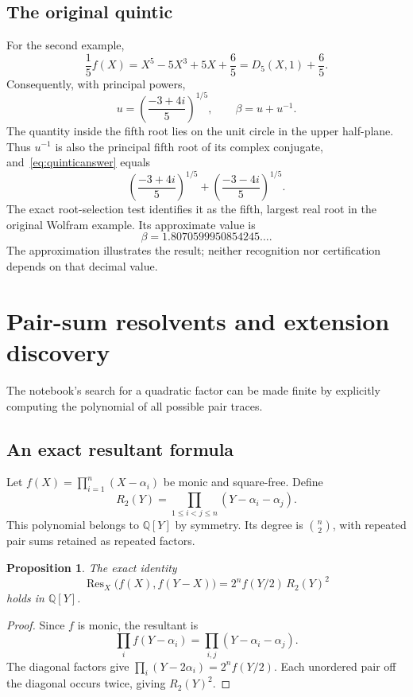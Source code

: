 \documentclass[11pt,a4paper]{article}
\newcommand{\Q}{\mathbb Q}
\newcommand{\Res}{\operatorname{Res}}
\newtheorem{proposition}[theorem]{Proposition}
\theoremstyle{definition}
\theoremstyle{remark}
\begin{document}
\subsection{The original quintic}

For the second example,
\[
 \frac15 f(X)=X^5-5X^3+5X+\frac65=D_5(X,1)+\frac65.
\]
Consequently, with principal powers,
\begin{equation}
 u=\left(\frac{-3+4i}{5}\right)^{1/5},\qquad
 \boxed{\displaystyle \beta=u+u^{-1}}.
 \label{eq:quinticanswer}
\end{equation}
The quantity inside the fifth root lies on the unit circle in the upper half-plane. Thus $u^{-1}$ is also the principal fifth root of its complex conjugate, and~\eqref{eq:quinticanswer} equals
\[
 \left(\frac{-3+4i}{5}\right)^{1/5}
 +\left(\frac{-3-4i}{5}\right)^{1/5}.
\]
The exact root-selection test identifies it as the fifth, largest real root in the original Wolfram example. Its approximate value is
\[
 \beta=1.8070599950854245\ldots.
\]
The approximation illustrates the result; neither recognition nor certification depends on that decimal value.

\section{Pair-sum resolvents and extension discovery}\label{sec:pairs}

The notebook's search for a quadratic factor can be made finite by explicitly computing the polynomial of all possible pair traces.

\subsection{An exact resultant formula}

Let $f(X)=\prod_{i=1}^{n}(X-\alpha_i)$ be monic and square-free. Define
\begin{equation}
 R_2(Y)=\prod_{1\le i<j\le n}(Y-\alpha_i-\alpha_j).
 \label{eq:r2}
\end{equation}
This polynomial belongs to $\Q[Y]$ by symmetry. Its degree is $\binom n2$, with repeated pair sums retained as repeated factors.

\begin{proposition}\label{prop:pairresultant}
The exact identity
\begin{equation}
 \Res_X\bigl(f(X),f(Y-X)\bigr)
 =2^n f(Y/2)\,R_2(Y)^2
 \label{eq:pairresultant}
\end{equation}
holds in $\Q[Y]$.
\end{proposition}
\begin{proof}
Since $f$ is monic, the resultant is
\[
 \prod_i f(Y-\alpha_i)
 =\prod_{i,j}(Y-\alpha_i-\alpha_j).
\]
The diagonal factors give $\prod_i(Y-2\alpha_i)=2^n f(Y/2)$. Each unordered pair off the diagonal occurs twice, giving $R_2(Y)^2$.
\end{proof}
\end{document}
